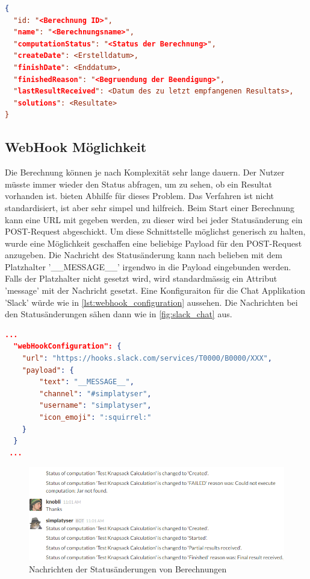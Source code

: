 \begin{lstlisting}[language=JSON, caption=Aufbau einer Antwort auf eine Statusabfrage, label=lst:status_response]  
{
  "id: "<Berechnung ID>",
  "name": "<Berechnungsname>",
  "computationStatus": "<Status der Berechnung>",
  "createDate": <Erstelldatum>,
  "finishDate": <Enddatum>,
  "finishedReason": "<Begruendung der Beendigung>",
  "lastResultReceived": <Datum des zu letzt empfangenen Resultats>,
  "solutions": <Resultate>
}
\end{lstlisting}

\subsection{WebHook Möglichkeit}
Die Berechnung können je nach Komplexität sehr lange dauern. Der Nutzer müsste immer wieder den Status abfragen, um zu sehen, ob ein Resultat vorhanden ist.  
bieten Abhilfe für dieses Problem. Das Verfahren ist nicht standardisiert, ist aber sehr simpel und hilfreich. Beim Start einer Berechnung kann eine URL mit gegeben werden, zu dieser 
wird bei jeder Statusänderung ein POST-Request abgeschickt. Um diese Schnittstelle möglichst generisch zu halten, wurde eine Möglichkeit geschaffen eine beliebige Payload für den 
POST-Request anzugeben. Die Nachricht des Statusänderung kann nach belieben mit dem Platzhalter '\_\_MESSAGE\_\_' irgendwo in die Payload eingebunden werden. Falls der Platzhalter nicht 
gesetzt wird, wird standardmässig ein Attribut 'message' mit der Nachricht gesetzt. Eine Konfiguraiton für die Chat Applikation 'Slack' würde wie in \autoref{lst:webhook_configuration} 
aussehen. Die Nachrichten bei den Statusänderungen sähen dann wie in \autoref{fig:slack_chat} aus.

\begin{lstlisting}[language=JSON, caption=Beispiel einer WebHook Konfiguration für Slack, label=lst:webhook_configuration]
  ...  
  "webHookConfiguration": {
    "url": "https://hooks.slack.com/services/T0000/B0000/XXX",
    "payload": {
        "text": "__MESSAGE__",
        "channel": "#simplatyser",
        "username": "simplatyser",
        "icon_emoji": ":squirrel:"
    }
  }
 ...
\end{lstlisting}

\begin{figure}[h]
\centering
\includegraphics[scale=0.8]{images/slack_chat.png}
\caption[Nachrichten der Statusänderungen von Berechnungen]{Nachrichten der Statusänderungen von Berechnungen \selfmade{}}
\label{fig:slack_chat}
\end{figure}

